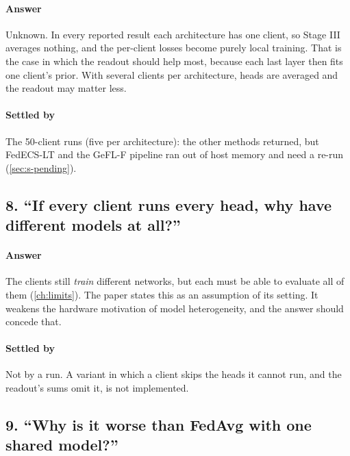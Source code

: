 \paragraph{Answer} Unknown. In every reported result each architecture has one client, so Stage III averages nothing,
and the per-client losses become purely local training. That is the case in which the readout should help most,
because each last layer then fits one client's prior. With several clients per architecture, heads are averaged and
the readout may matter less.

\paragraph{Settled by} The 50-client runs (five per architecture): the other methods returned, but FedECS-LT and the
GeFL-F pipeline ran out of host memory and need a re-run (\cref{sec:s-pending}).

\subsection*{8. ``If every client runs every head, why have different models at all?''}

\paragraph{Answer} The clients still \emph{train} different networks, but each must be able to evaluate all of them
(\cref{ch:limits}). The paper states this as an assumption of its setting. It weakens the hardware motivation of model
heterogeneity, and the answer should concede that.

\paragraph{Settled by} Not by a run. A variant in which a client skips the heads it cannot run, and the readout's sums
omit it, is not implemented.

\subsection*{9. ``Why is it worse than FedAvg with one shared model?''}

